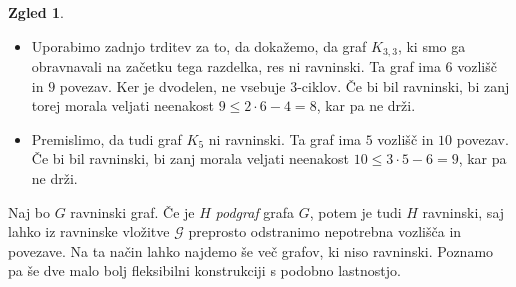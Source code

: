 \documentclass[11pt]{book}
\def\GG{\mathcal{G}}
\theoremstyle{definition}
\theoremstyle{zgled}
\newtheorem*{zgled}{Zgled}
\theoremstyle{odprtproblem}
\theoremstyle{domacanaloga}
\theoremstyle{izrek}
\begin{document}
\begin{zgled}
\leavevmode
\begin{itemize}
    \item Uporabimo zadnjo trditev za to, da dokažemo, da graf $K_{3,3}$, ki smo ga obravnavali na začetku tega razdelka, res ni ravninski. Ta graf ima $6$ vozlišč in $9$ povezav. Ker je dvodelen, ne vsebuje $3$-ciklov. Če bi bil ravninski, bi zanj torej morala veljati neenakost $9 \leq 2 \cdot 6 - 4 = 8$, kar pa ne drži.
    \item Premislimo, da tudi graf $K_5$ ni ravninski. Ta graf ima $5$ vozlišč in $10$ povezav. Če bi bil ravninski, bi zanj morala veljati neenakost $10 \leq 3 \cdot 5 - 6 = 9$, kar pa ne drži.
\end{itemize}
\end{zgled}

Naj bo $G$ ravninski graf. Če je $H$ \emph{podgraf} grafa $G$, potem je tudi $H$ ravninski, saj lahko iz ravninske vložitve $\GG$ preprosto odstranimo nepotrebna vozlišča in povezave. Na ta način lahko najdemo še več grafov, ki niso ravninski. Poznamo pa še dve malo bolj fleksibilni konstrukciji s podobno lastnostjo.
\end{document}
